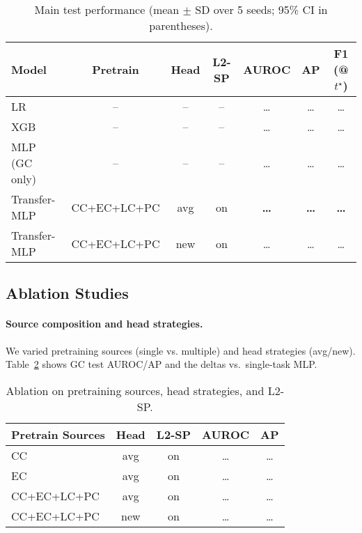 \documentclass[diagnostics,article,submit,pdftex,moreauthors]{Definitions/mdpi}
\begin{document}




\begin{table}[H]
\caption{Main test performance (mean $\pm$ SD over 5 seeds; 95\% CI in parentheses).}
\label{tab:main}
\centering
\begin{tabular}{lcccccc}
\toprule
Model & Pretrain & Head & L2-SP & AUROC & AP & F1 (@$t^\star$) \\
\midrule
LR & -- & -- & -- & \dots & \dots & \dots \\
XGB & -- & -- & -- & \dots & \dots & \dots \\
MLP (GC only) & -- & -- & -- & \dots & \dots & \dots \\
Transfer-MLP & CC+EC+LC+PC & avg & on & \textbf{\dots} & \textbf{\dots} & \textbf{\dots} \\
Transfer-MLP & CC+EC+LC+PC & new & on & \dots & \dots & \dots \\
\bottomrule
\end{tabular}
\end{table}

\subsection{Ablation Studies}
\paragraph{Source composition and head strategies.}
We varied pretraining sources (single vs. multiple) and head strategies (avg/new).
Table~\ref{tab:ablation} shows GC test AUROC/AP and the deltas vs.\ single-task MLP.

\begin{table}[H]
\caption{Ablation on pretraining sources, head strategies, and L2-SP.}
\label{tab:ablation}
\centering
\begin{tabular}{lcccc}
\toprule
Pretrain Sources & Head & L2-SP & AUROC & AP \\
\midrule
CC & avg & on & \dots & \dots \\
EC & avg & on & \dots & \dots \\
CC+EC+LC+PC & avg & on & \dots & \dots \\
CC+EC+LC+PC & new & on & \dots & \dots \\
\bottomrule
\end{tabular}
\end{table}
\end{document}

